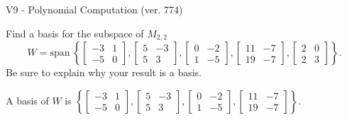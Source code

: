 \begin{exercise}
  \begin{exerciseTitle}V9 - Polynomial Computation (ver. 774)\end{exerciseTitle}
  \begin{exerciseStatement}
    Find a basis for the subspace of \(M_{2,2}\) 
\[W=\mathrm{span}\ \left\{\left[\begin{array}{cc}
-3 & 1 \\
-5 & 0
\end{array}\right] , \left[\begin{array}{cc}
5 & -3 \\
5 & 3
\end{array}\right] , \left[\begin{array}{cc}
0 & -2 \\
1 & -5
\end{array}\right] , \left[\begin{array}{cc}
11 & -7 \\
19 & -7
\end{array}\right] , \left[\begin{array}{cc}
2 & 0 \\
2 & 3
\end{array}\right]\right\}.\]
 Be sure to explain why your result is a basis.


  \end{exerciseStatement}
  \begin{exerciseAnswer}
   A basis of \(W\) is  \(\left\{\left[\begin{array}{cc}
-3 & 1 \\
-5 & 0
\end{array}\right] , \left[\begin{array}{cc}
5 & -3 \\
5 & 3
\end{array}\right] , \left[\begin{array}{cc}
0 & -2 \\
1 & -5
\end{array}\right] , \left[\begin{array}{cc}
11 & -7 \\
19 & -7
\end{array}\right]\right\}\).
  


  \end{exerciseAnswer}
\end{exercise}
